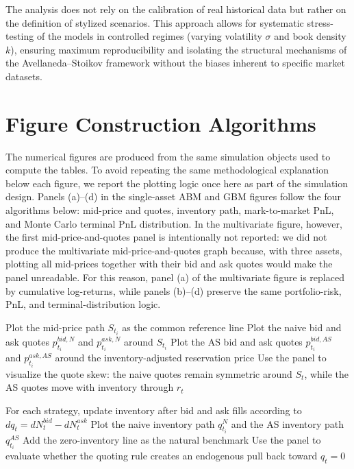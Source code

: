 \documentclass[a4paper,10pt,titlepage,oneside,openany]{book}
\theoremstyle{plain}\newtheorem{theorem}{Theorem}[chapter]
\theoremstyle{definition}\newtheorem{definition}{Definition}[chapter]
\theoremstyle{remark}\newtheorem{remark}{Remark}[chapter]
\begin{document}
The analysis does not rely on the calibration of real historical data but rather on the definition of stylized scenarios. This approach allows for systematic stress-testing of the models in controlled regimes (varying volatility $\sigma$ and book density $k$), ensuring maximum reproducibility and isolating the structural mechanisms of the Avellaneda--Stoikov framework without the biases inherent to specific market datasets.





\section{Figure Construction Algorithms}
The numerical figures are produced from the same simulation objects used to compute the tables. To avoid repeating the same methodological explanation below each figure, we report the plotting logic once here as part of the simulation design. Panels (a)--(d) in the single-asset ABM and GBM figures follow the four algorithms below: mid-price and quotes, inventory path, mark-to-market PnL, and Monte Carlo terminal PnL distribution. In the multivariate figure, however, the first mid-price-and-quotes panel is intentionally not reported: we did not produce the multivariate mid-price-and-quotes graph because, with three assets, plotting all mid-prices together with their bid and ask quotes would make the panel unreadable. For this reason, panel (a) of the multivariate figure is replaced by cumulative log-returns, while panels (b)--(d) preserve the same portfolio-risk, PnL, and terminal-distribution logic.

\begin{algorithm}[H]
\caption{Panel (a): Mid-price and quotes}
\DontPrintSemicolon
{}
Plot the mid-price path $S_{t_i}$ as the common reference line\;
Plot the naive bid and ask quotes $p_{t_i}^{bid,N}$ and $p_{t_i}^{ask,N}$ around $S_{t_i}$\;
Plot the AS bid and ask quotes $p_{t_i}^{bid,AS}$ and $p_{t_i}^{ask,AS}$ around the inventory-adjusted reservation price\;
Use the panel to visualize the quote skew: the naive quotes remain symmetric around $S_t$, while the AS quotes move with inventory through $r_t$\;
\end{algorithm}

\begin{algorithm}[H]
\caption{Panel (b): Inventory path}
\DontPrintSemicolon
{}
For each strategy, update inventory after bid and ask fills according to $dq_t=dN_t^{bid}-dN_t^{ask}$\;
Plot the naive inventory path $q_{t_i}^{N}$ and the AS inventory path $q_{t_i}^{AS}$\;
Add the zero-inventory line as the natural benchmark\;
Use the panel to evaluate whether the quoting rule creates an endogenous pull back toward $q_t=0$\;
\end{algorithm}
\end{document}
